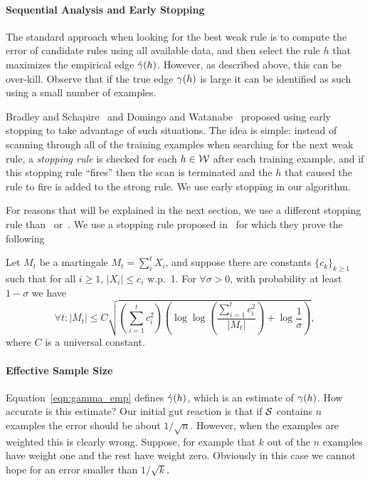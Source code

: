 \paragraph{Sequential Analysis and Early Stopping}\label{sec:methods:early-stop}
The standard approach when looking for the best weak rule
is to compute the error of candidate rules using
all available data, and then select the rule $h$ that maximizes the empirical
edge $\hat{\gamma}(h)$. However, as described above, this can be
over-kill. Observe that if the true edge $\gamma(h)$ is large it can be
identified as such using a small number of examples.

Bradley and Schapire~\cite{bradley_filterboost:_2007} and Domingo and
Watanabe~\cite{domingo_scaling_2000} proposed using early stopping to
take advantage of such situations. The idea is simple: instead of
scanning through all of the training examples when searching for the
next weak rule, a {\em stopping rule} is checked for each $h \in \mathcal{W}$
after each training example, and if this stopping rule ``fires'' then
the scan is terminated and the $h$ that caused the rule to fire is
added to the strong rule. We use early stopping in our algorithm.

For reasons that will be explained in the next section, we use a different
stopping rule than~\cite{bradley_filterboost:_2007}
or~\cite{domingo_scaling_2000}. We use a stopping rule proposed
in~\cite{balsubramani_sharp_2014} for which they prove the following

\begin{theorem} \label{thm:balsubramani}
  Let $M_t$ be a martingale $M_t = \sum_i^t X_i$,
  and suppose there are constants $\{c_k\}_{k \geq 1}$ such that
  for all $i \geq 1$, $|X_i| \leq c_i$ w.p.\ 1.
  For $\forall \sigma > 0$, with probability at least $1 - \sigma$ we have
  \[
  \forall t: |M_t| \leq C \sqrt{
    \left( \sum_{i=1}^t c_i^2 \right)
    \left( \log \log \left( \frac{ \sum_{i=1}^t c_i^2 }{ |M_t| }\right) +
    \log \frac{1}{\sigma} \right)
  },
  \]
  where $C$ is a universal constant.
\end{theorem}

\paragraph{Effective Sample Size}
\label{sec:effectiveSampleSize}
Equation~\ref{eqn:gamma_emp} defines $\hat{\gamma}(h)$, which is an
estimate of $\gamma(h)$. How accurate is this estimate? Our initial
gut reaction is that if ${\cal S}$ contains $n$ examples the error should be
about $1/\sqrt{n}$. However, when the examples are weighted this is
clearly wrong. Suppose, for example that $k$ out of the $n$ examples
have weight one and the rest have weight zero. Obviously in this case
we cannot hope for an error smaller than $1/\sqrt{k}$.

